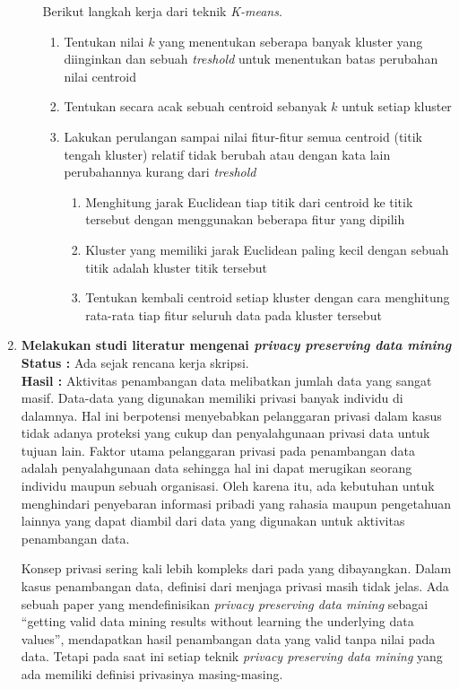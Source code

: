 \documentclass[a4paper,twoside]{article}
\begin{document}
\begin{enumerate}
\begin{enumerate}
			Berikut langkah kerja dari teknik \textit{K-means}.
			\begin{enumerate}
				\item Tentukan nilai \(k\) yang menentukan seberapa banyak kluster yang diinginkan dan sebuah \textit{treshold} untuk menentukan batas perubahan nilai centroid
				\item Tentukan secara acak sebuah centroid sebanyak \(k\)  untuk setiap kluster
				\item Lakukan perulangan sampai nilai fitur-fitur semua centroid (titik tengah kluster) relatif tidak berubah atau dengan kata lain perubahannya kurang dari \textit{treshold}
				\begin{enumerate}
					\item Menghitung jarak Euclidean tiap titik dari centroid ke titik tersebut dengan menggunakan beberapa fitur yang dipilih
					\item Kluster yang memiliki jarak Euclidean paling kecil dengan sebuah titik adalah kluster titik tersebut
					\item Tentukan kembali centroid setiap kluster dengan cara menghitung rata-rata tiap fitur seluruh data pada kluster tersebut
				\end{enumerate}
			\end{enumerate}
		\end{enumerate}

		\item \textbf{Melakukan studi literatur mengenai \textit{privacy preserving data mining}}\\
		{\bf Status :} Ada sejak rencana kerja skripsi.\\
		{\bf Hasil :} Aktivitas penambangan data melibatkan jumlah data yang sangat masif. Data-data yang digunakan memiliki privasi banyak individu di dalamnya. Hal ini berpotensi menyebabkan pelanggaran privasi dalam kasus tidak adanya proteksi yang cukup dan penyalahgunaan privasi data untuk tujuan lain. Faktor utama pelanggaran privasi pada penambangan data adalah penyalahgunaan data sehingga hal ini dapat merugikan seorang individu maupun sebuah organisasi. Oleh karena itu, ada kebutuhan untuk menghindari penyebaran informasi pribadi yang rahasia maupun pengetahuan lainnya yang dapat diambil dari data yang digunakan untuk aktivitas penambangan data.
		
		Konsep privasi sering kali lebih kompleks dari pada yang dibayangkan. Dalam kasus penambangan data, definisi dari menjaga privasi masih tidak jelas. Ada sebuah paper yang mendefinisikan \textit{privacy preserving data mining} sebagai “getting valid data mining results without learning the underlying data values”, mendapatkan hasil penambangan data yang valid tanpa  nilai pada data. Tetapi pada saat ini setiap teknik \textit{privacy preserving data mining} yang ada memiliki definisi privasinya masing-masing. 
		

\end{enumerate}
\end{document}

